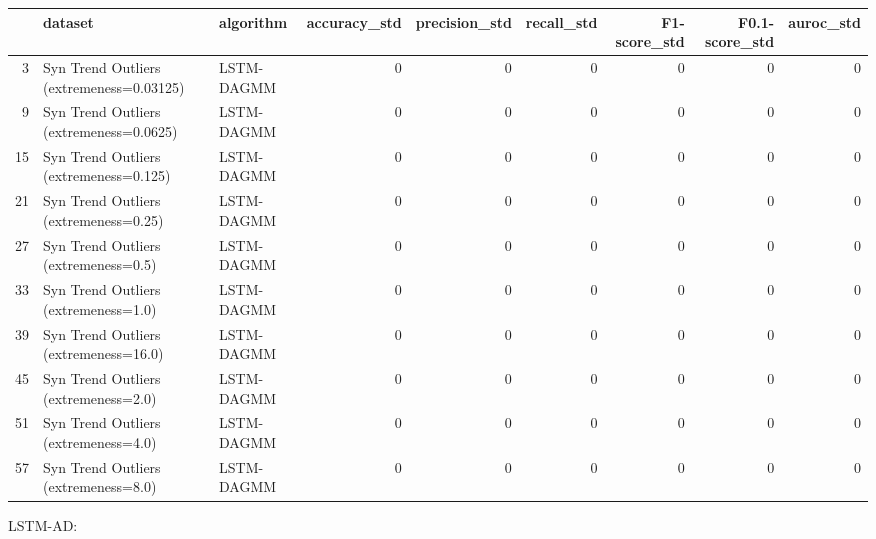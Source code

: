 \begin{tabular}{rllrrrrrr}
\hline
    & dataset                                  & algorithm   &   accuracy\_std &   precision\_std &   recall\_std &   F1-score\_std &   F0.1-score\_std &   auroc\_std \\
\hline
  3 & Syn Trend Outliers (extremeness=0.03125) & LSTM-DAGMM  &              0 &               0 &            0 &              0 &                0 &           0 \\
  9 & Syn Trend Outliers (extremeness=0.0625)  & LSTM-DAGMM  &              0 &               0 &            0 &              0 &                0 &           0 \\
 15 & Syn Trend Outliers (extremeness=0.125)   & LSTM-DAGMM  &              0 &               0 &            0 &              0 &                0 &           0 \\
 21 & Syn Trend Outliers (extremeness=0.25)    & LSTM-DAGMM  &              0 &               0 &            0 &              0 &                0 &           0 \\
 27 & Syn Trend Outliers (extremeness=0.5)     & LSTM-DAGMM  &              0 &               0 &            0 &              0 &                0 &           0 \\
 33 & Syn Trend Outliers (extremeness=1.0)     & LSTM-DAGMM  &              0 &               0 &            0 &              0 &                0 &           0 \\
 39 & Syn Trend Outliers (extremeness=16.0)    & LSTM-DAGMM  &              0 &               0 &            0 &              0 &                0 &           0 \\
 45 & Syn Trend Outliers (extremeness=2.0)     & LSTM-DAGMM  &              0 &               0 &            0 &              0 &                0 &           0 \\
 51 & Syn Trend Outliers (extremeness=4.0)     & LSTM-DAGMM  &              0 &               0 &            0 &              0 &                0 &           0 \\
 57 & Syn Trend Outliers (extremeness=8.0)     & LSTM-DAGMM  &              0 &               0 &            0 &              0 &                0 &           0 \\
\hline
\end{tabular}

LSTM-AD:

